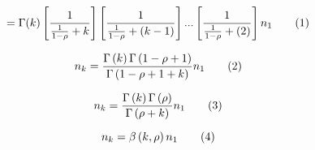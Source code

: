\[
  =
  \Gamma(k)
  \left[
    \frac{
      1
    }{
      \frac{1}{1 - \rho} + k
    }
  \right]
  \left[
    \frac{
      1
    }{
      \frac{1}{1 - \rho} + (k - 1)
    }
  \right]
  ...
  \left[
    \frac{
      1
    }{
      \frac{1}{1 - \rho} + (2)
    }
  \right]
  n_1
  \addtag
\]

\[
  n_k
  =
  \frac{
    \Gamma
    \left(
      k
    \right)
    \Gamma
    \left(
      1 - \rho + 1
    \right)
  }{
    \Gamma
    \left(
      1 - \rho + 1 + k
    \right)
  }
  n_1
  \addtag
\]

\[
  n_k
  =
  \frac{
    \Gamma
    \left(
      k
    \right)
    \Gamma
    \left(
      \rho
    \right)
  }{
    \Gamma
    \left(
      \rho + k
    \right)
  }
  n_1
  \addtag
\]


\[
  n_k
  = 
  \beta
  \left(
    k,
    \rho
  \right)
  n_1
  \addtag
\]